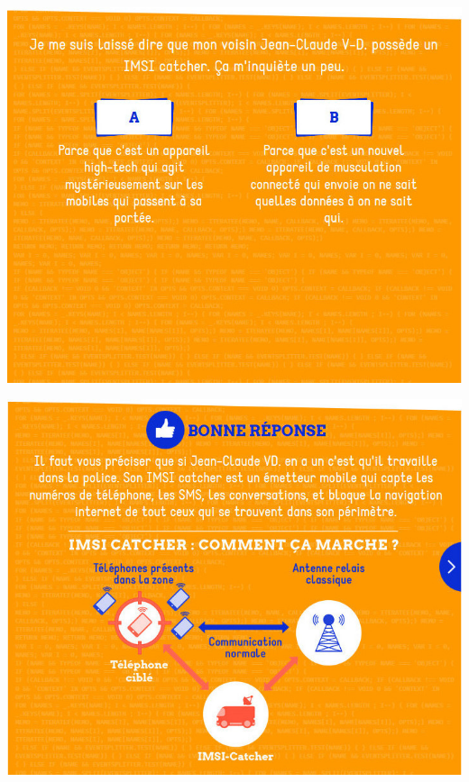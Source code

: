 \documentclass{beamer}
\begin{document}
\begin{frame}\includegraphics[scale=0.6] {./images/Quizz_HygieneNumerique_France4_4.jpg} \end{frame}
\begin{frame}\includegraphics[scale=0.6] {./images/Quizz_HygieneNumerique_France4_5.jpg} \end{frame}
\end{document}
